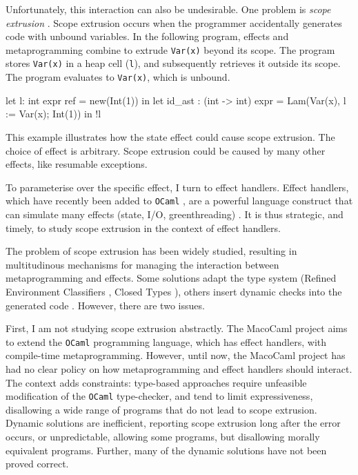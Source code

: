 Unfortunately, this interaction can also be undesirable. One problem is \textit{scope extrusion} \citep{kiselyov-14}. Scope extrusion occurs when the programmer accidentally generates code with unbound variables. In the following program, effects and metaprogramming combine to extrude \texttt{Var(x)} beyond its scope. The program stores \texttt{Var(x)} in a heap cell (\texttt{l}), and subsequently retrieves it outside its scope. The program evaluates to \texttt{Var(x)}, which is unbound.

\begin{ocaml}
let l: int expr ref = new(Int(1)) in 
let id_ast : (int -> int) expr = Lam(Var(x), l := Var(x); Int(1)) in
!l
\end{ocaml} 

This example illustrates how the state effect could cause scope extrusion. The choice of effect is arbitrary. Scope extrusion could be caused by many other effects, like resumable exceptions.

To parameterise over the specific effect, I turn to effect handlers. Effect handlers, which have recently been added to \texttt{OCaml} \citep{sivaramakrishnan-21}, are a powerful language construct that can simulate many effects (state, I/O, greenthreading) \citep{pretnar-15}. It is thus strategic, and timely, to study scope extrusion in the context of effect handlers. 

The problem of scope extrusion has been widely studied, resulting in multitudinous mechanisms for managing the interaction between metaprogramming and effects. Some solutions adapt the type system (Refined Environment Classifiers \citep{kiselyov-16,isoda-24}, Closed Types \citep{calcagno-00}), others insert dynamic checks into the generated code \citep{kiselyov-14}. However, there are two issues.

First, I am not studying scope extrusion abstractly. The MacoCaml \citep{xie-2022} project aims to extend the \texttt{OCaml} programming language, which has effect handlers, with compile-time metaprogramming. However, until now, the MacoCaml project has had no clear policy on how metaprogramming and effect handlers should interact. The context adds constraints: type-based approaches require unfeasible modification of the \texttt{OCaml} type-checker, and tend to limit expressiveness, disallowing a wide range of programs that do not lead to scope extrusion. Dynamic solutions are inefficient, reporting scope extrusion long after the error occurs, or unpredictable, allowing some programs, but disallowing morally equivalent programs. Further, many of the dynamic solutions have not been proved correct.

